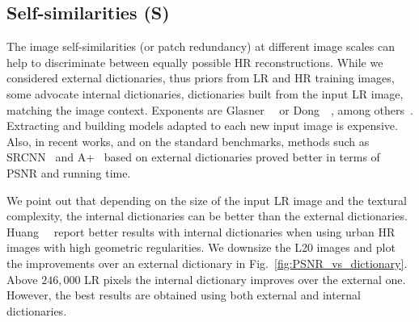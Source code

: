 \documentclass[10pt,twocolumn,letterpaper]{article}
\begin{document}
\subsection{Self-similarities (S)}
\label{ssc:selfsimilarities}
The image self-similarities (or patch redundancy) at different image scales can help to discriminate between equally possible HR reconstructions.
While we considered external dictionaries, thus priors from LR and HR training images,
some advocate internal dictionaries, \ie dictionaries built from the input LR image, matching the image context. Exponents are Glasner~\etal~\cite{Glasner-ICCV-2009} or Dong~\etal~\cite{Dong-TIP-2013}, among others~\cite{Yang-ACCV-2010-short,Freedman-TG-2011,Yang-CVPR-2013,Huang-CVPR-2015}. Extracting and building models adapted to each new input image is expensive. Also, in recent works, and on the standard benchmarks, methods such as SRCNN~\cite{Dong-ECCV-2014} and A+~\cite{Timofte-ACCV-2014} based on external dictionaries proved better in terms of PSNR and running time.

We point out that depending on the size of the input LR image and the textural complexity, the internal dictionaries can be better than the external dictionaries. Huang~\etal~\cite{Huang-CVPR-2015} report better results with internal dictionaries when using urban HR images with high geometric regularities.
We downsize the L20 images and plot the improvements over an external dictionary in Fig.~\ref{fig:PSNR_vs_dictionary}. Above $246,000$ LR pixels the internal dictionary improves over the external one. However, the best results are obtained using both external and internal dictionaries.
\end{document}
